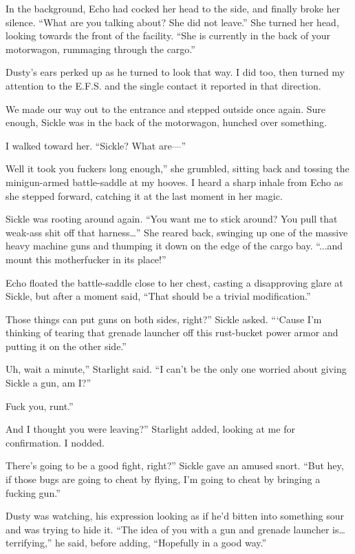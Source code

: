 In the background, Echo had cocked her head to the side, and finally broke her silence. “What are you talking about? She did not leave.” She turned her head, looking towards the front of the facility. “She is currently in the back of your motorwagon, rummaging through the cargo.”

Dusty’s ears perked up as he turned to look that way. I did too, then turned my attention to the E.F.S. and the single contact it reported in that direction.

We made our way out to the entrance and stepped outside once again. Sure enough, Sickle was in the back of the motorwagon, hunched over something.

I walked toward her. “Sickle? What are—”

\leavevmode{}Well it took you fuckers long enough,” she grumbled, sitting back and tossing the minigun-armed battle-saddle at my hooves. I heard a sharp inhale from Echo as she stepped forward, catching it at the last moment in her magic.

Sickle was rooting around again. “You want me to stick around? You pull that weak-ass shit off that harness…” She reared back, swinging up one of the massive heavy machine guns and thumping it down on the edge of the cargo bay. “...and mount this motherfucker in its place!”

Echo floated the battle-saddle close to her chest, casting a disapproving glare at Sickle, but after a moment said, “That should be a trivial modification.”

\leavevmode{}Those things can put guns on both sides, right?” Sickle asked. “‘Cause I’m thinking of tearing that grenade launcher off this rust-bucket power armor and putting it on the other side.”

\leavevmode{}Uh, wait a minute,” Starlight said. “I can’t be the only one worried about giving Sickle a gun, am I?”

\leavevmode{}Fuck you, runt.”

\leavevmode{}And I thought you were leaving?” Starlight added, looking at me for confirmation. I nodded.

\leavevmode{}There’s going to be a good fight, right?” Sickle gave an amused snort. “But hey, if those bugs are going to cheat by flying, I’m going to cheat by bringing a fucking gun.”

Dusty was watching, his expression looking as if he’d bitten into something sour and was trying to hide it. “The idea of you with a gun and grenade launcher is… terrifying,” he said, before adding, “Hopefully in a good way.”

